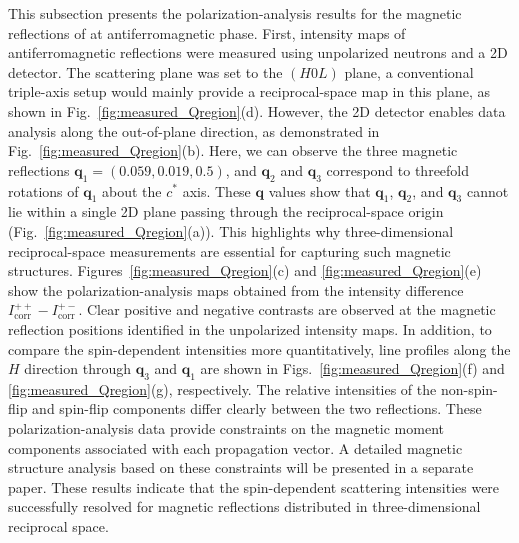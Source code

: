 \documentclass[%
 reprint,
superscriptaddress,
 amsmath,amssymb,
 aps,
floatfix,
]{revtex4-2}
\begin{document}
This subsection presents the polarization-analysis results for the magnetic reflections of  at antiferromagnetic phase.
First, intensity maps of antiferromagnetic reflections were measured using unpolarized neutrons and a 2D detector.
The scattering plane was set to the \((H0L)\) plane, a conventional triple-axis setup would mainly provide a reciprocal-space map in this plane, as shown in Fig.~\ref{fig:measured_Qregion}(d).
However, the 2D detector enables data analysis along the out-of-plane direction, as demonstrated in Fig.~\ref{fig:measured_Qregion}(b).
Here, we can observe the three magnetic reflections $\boldsymbol{q}_1 = (0.059, 0.019, 0.5)$, and $\boldsymbol{q}_2$ and $\boldsymbol{q}_3$ correspond to threefold rotations of $\boldsymbol{q}_1$ about the $c^*$ axis.
These $\boldsymbol{q}$ values show that $\boldsymbol{q}_1$, $\boldsymbol{q}_2$, and $\boldsymbol{q}_3$ cannot lie within a single 2D plane passing through the reciprocal-space origin (Fig.~\ref{fig:measured_Qregion}(a)).
This highlights why three-dimensional reciprocal-space measurements are essential for capturing such magnetic structures.
Figures~\ref{fig:measured_Qregion}(c) and \ref{fig:measured_Qregion}(e) show the polarization-analysis maps obtained from the intensity difference \(I^{++}_\mathrm{corr}-I^{+-}_\mathrm{corr}\).
Clear positive and negative contrasts are observed at the magnetic reflection positions identified in the unpolarized intensity maps.
In addition, to compare the spin-dependent intensities more quantitatively, line profiles along the \(H\) direction through \(\boldsymbol{q}_3\) and \(\boldsymbol{q}_1\) are shown in Figs.~\ref{fig:measured_Qregion}(f) and \ref{fig:measured_Qregion}(g), respectively.
The relative intensities of the non-spin-flip and spin-flip components differ clearly between the two reflections.
These polarization-analysis data provide constraints on the magnetic moment components associated with each propagation vector.
A detailed magnetic structure analysis based on these constraints will be presented in a separate paper.
These results indicate that the spin-dependent scattering intensities were successfully resolved for magnetic reflections distributed in three-dimensional reciprocal space.
\end{document}
